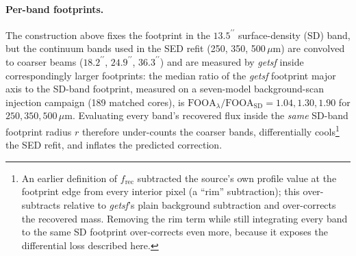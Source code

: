 \documentclass[11pt,a4paper]{article}
\begin{document}
\paragraph{Per-band footprints.} The construction above fixes the footprint in
the $13.5^{\prime\prime}$ surface-density (SD) band, but the continuum bands used in the
SED refit (250, 350, 500\,$\mu$m) are convolved to coarser beams
($18.2^{\prime\prime}$, $24.9^{\prime\prime}$, $36.3^{\prime\prime}$) and are measured by \emph{getsf}
inside correspondingly larger footprints: the median ratio of the \emph{getsf}
footprint major axis to the SD-band footprint, measured on a seven-model
background-scan injection campaign (189 matched cores), is
$\mathrm{FOOA}_\lambda/\mathrm{FOOA}_{\mathrm{SD}} = 1.04, 1.30, 1.90$ for
$250, 350, 500\,\mu$m. Evaluating every band's recovered flux inside the
\emph{same} SD-band footprint radius $r$ therefore under-counts the coarser
bands, differentially cools\footnote{An earlier definition of $f_{\mathrm{rec}}$
subtracted the source's own profile value at the footprint edge from every
interior pixel (a ``rim'' subtraction); this over-subtracts relative to
\emph{getsf}'s plain background subtraction and over-corrects the recovered
mass. Removing the rim term while still integrating every band to the same SD
footprint over-corrects even more, because it exposes the differential loss
described here.} the SED refit, and inflates the predicted correction.
\end{document}
